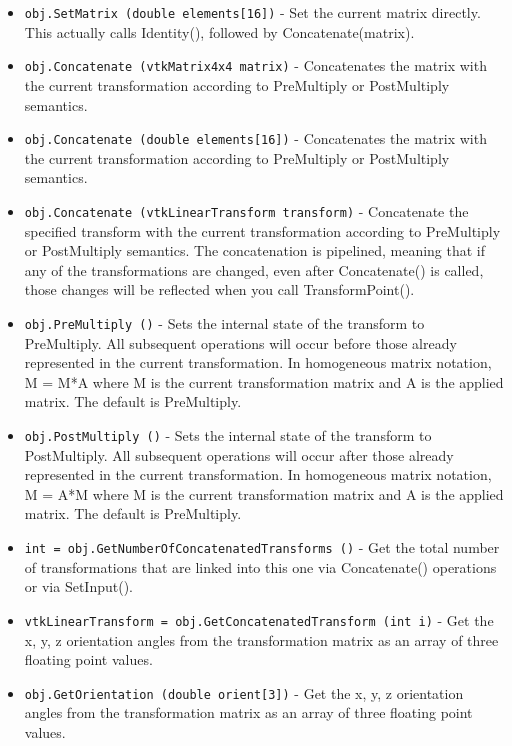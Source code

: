 \begin{itemize}
\item  \verb|obj.SetMatrix (double elements[16])| -  Set the current matrix directly.  This actually calls Identity(),
 followed by Concatenate(matrix).

\item  \verb|obj.Concatenate (vtkMatrix4x4 matrix)| -  Concatenates the matrix with the current transformation according
 to PreMultiply or PostMultiply semantics.

\item  \verb|obj.Concatenate (double elements[16])| -  Concatenates the matrix with the current transformation according
 to PreMultiply or PostMultiply semantics.

\item  \verb|obj.Concatenate (vtkLinearTransform transform)| -  Concatenate the specified transform with the current transformation
 according to PreMultiply or PostMultiply semantics.
 The concatenation is pipelined, meaning that if any of the
 transformations are changed, even after Concatenate() is called,
 those changes will be reflected when you call TransformPoint().

\item  \verb|obj.PreMultiply ()| -  Sets the internal state of the transform to PreMultiply. All subsequent
 operations will occur before those already represented in the
 current transformation.  In homogeneous matrix notation, M = M*A where
 M is the current transformation matrix and A is the applied matrix.
 The default is PreMultiply.

\item  \verb|obj.PostMultiply ()| -  Sets the internal state of the transform to PostMultiply. All subsequent
 operations will occur after those already represented in the
 current transformation.  In homogeneous matrix notation, M = A*M where
 M is the current transformation matrix and A is the applied matrix.
 The default is PreMultiply.

\item  \verb|int = obj.GetNumberOfConcatenatedTransforms ()| -  Get the total number of transformations that are linked into this
 one via Concatenate() operations or via SetInput().

\item  \verb|vtkLinearTransform = obj.GetConcatenatedTransform (int i)| -  Get the x, y, z orientation angles from the transformation matrix as an
 array of three floating point values.  

\item  \verb|obj.GetOrientation (double orient[3])| -  Get the x, y, z orientation angles from the transformation matrix as an
 array of three floating point values.  


\end{itemize}
